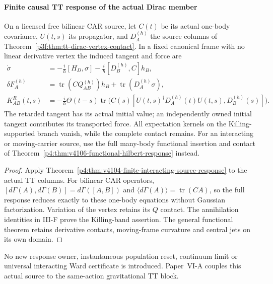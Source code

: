 \documentclass[12pt,a4paper]{article}
\begin{document}
\paragraph{Finite causal TT response of the actual Dirac member}
\label{p4:sec:finite-tt-dirac-response}
\begin{corollary}
\label{p4:cor:finite-tt-source-response}
On a licensed free bilinear CAR source, let $C(t)$ be its actual one-body
covariance, $U(t,s)$ its propagator, and $D_A^{(h)}$ the source columns of
Theorem~\ref{p3f:thm:tt-dirac-vertex-contact}. In a fixed canonical frame
with no linear derivative vertex the induced tangent and force are
\begin{align*}
 \dot\sigma&=-\frac{i}{\hbar}[H_D,\sigma]
       -\frac{i}{\hbar}[D_B^{(h)},C]h_B,\\
 \delta F_A^{(h)}&=\operatorname{tr}(CQ_{AB}^{(h)})h_B
                         +\operatorname{tr}(D_A^{(h)}\sigma),\\
 K^R_{AB}(t,s)&=-\frac{i}{\hbar}\Theta(t-s)
  \operatorname{tr}\bigl(C(s)
      [U(t,s)^\dagger D_A^{(h)}(t)U(t,s),D_B^{(h)}(s)]\bigr).
\end{align*}
The retarded tangent has its actual initial value; an independently owned
initial tangent contributes its transported force. All expectation kernels
on the Killing-supported branch vanish, while the complete contact remains.
For an interacting or moving-carrier source, use the full many-body
functional insertion and contact of
Theorem~\ref{p4:thm:v4106-functional-hilbert-response} instead.
\end{corollary}
\begin{proof}
Apply Theorem~\ref{p4:thm:v4104-finite-interacting-source-response} to the
actual TT columns. For bilinear CAR operators,
$[d\Gamma(A),d\Gamma(B)]=d\Gamma([A,B])$ and
$\langle d\Gamma(A)\rangle=\operatorname{tr}(CA)$, so the full response
reduces exactly to these one-body equations without Gaussian factorization.
Variation of the vertex retains its $Q$ contact. The annihilation identities
in III-F prove the Killing-band assertion. The general functional theorem
retains derivative contacts, moving-frame curvature and central jets on
its own domain.
\end{proof}
No new response owner, instantaneous population reset, continuum limit or
universal interacting Ward certificate is introduced. Paper~VI-A couples
this actual source to the same-action gravitational TT block.

\end{document}
